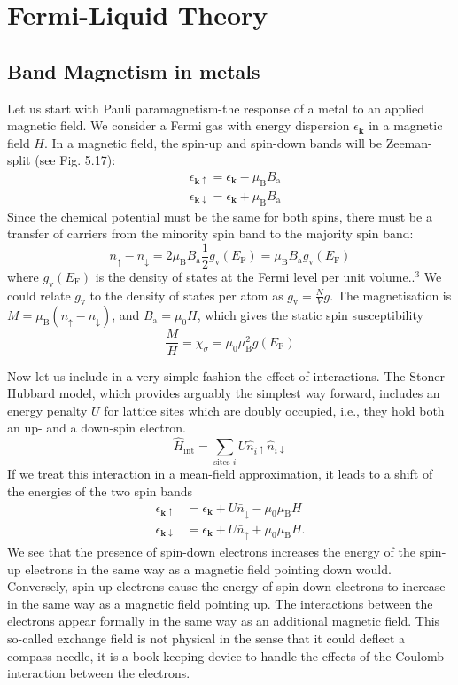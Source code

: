 \documentclass[12pt,a4paper]{article}
\begin{document}
\section{Fermi-Liquid Theory}
\subsection{Band Magnetism in metals}
Let us start with Pauli paramagnetism-the response of a metal to an applied magnetic field. We consider a Fermi gas with energy dispersion $\epsilon_{\boldsymbol{k}}$ in a magnetic field $H$. In a magnetic field, the spin-up and spin-down bands will be Zeeman-split (see Fig. 5.17):
$$
\begin{aligned}
& \epsilon_{\boldsymbol{k} \uparrow}=\epsilon_{\boldsymbol{k}}-\mu_{\mathrm{B}} B_{\mathrm{a}} \\
& \epsilon_{\boldsymbol{k} \downarrow}=\epsilon_{\boldsymbol{k}}+\mu_{\mathrm{B}} B_{\mathrm{a}}
\end{aligned}
$$
Since the chemical potential must be the same for both spins, there must be a transfer of carriers from the minority spin band to the majority spin band:
$$
n_{\uparrow}-n_{\downarrow}=2 \mu_{\mathrm{B}} B_{\mathrm{a}} \frac{1}{2} g_{\mathrm{v}}\left(E_{\mathrm{F}}\right)=\mu_{\mathrm{B}} B_{\mathrm{a}} g_{\mathrm{v}}\left(E_{\mathrm{F}}\right)
$$
where $g_{\mathrm{v}}\left(E_{\mathrm{F}}\right)$ is the density of states at the Fermi level per unit volume..$^3$ We could relate $g_{\mathrm{v}}$ to the density of states per atom as $g_{\mathrm{v}}=\frac{N}{V} g$. The magnetisation is $M=\mu_{\mathrm{B}}\left(n_{\uparrow}-n_{\downarrow}\right)$, and $B_{\mathrm{a}}=\mu_0 H$, which gives the static spin susceptibility
$$
\frac{M}{H}=\chi_\sigma=\mu_0 \mu_{\mathrm{B}}^2 g\left(E_{\mathrm{F}}\right)
$$

Now let us include in a very simple fashion the effect of interactions. The Stoner-Hubbard model, which provides arguably the simplest way forward, includes an energy penalty $U$ for lattice sites which are doubly occupied, i.e., they hold both an up- and a down-spin electron.
$$
\hat{H}_{\mathrm{int}}=\sum_{\text {sites } i} U \hat{n}_{i \uparrow} \hat{n}_{i \downarrow}
$$
If we treat this interaction in a mean-field approximation, it leads to a shift of the energies of the two spin bands
$$
\begin{aligned}
\epsilon_{\boldsymbol{k} \uparrow} & =\epsilon_{\boldsymbol{k}}+U \bar{n}_{\downarrow}-\mu_0 \mu_{\mathrm{B}} H \\
\epsilon_{\boldsymbol{k} \downarrow} & =\epsilon_{\boldsymbol{k}}+U \bar{n}_{\uparrow}+\mu_0 \mu_{\mathrm{B}} H .
\end{aligned}
$$
We see that the presence of spin-down electrons increases the energy of the spin-up electrons in the same way as a magnetic field pointing down would. Conversely, spin-up electrons cause the energy of spin-down electrons to increase in the same way as a magnetic field pointing up. The interactions between the electrons appear formally in the same way as an additional magnetic field. This so-called exchange field is not physical in the sense that it could deflect a compass needle, it is a book-keeping device to handle the effects of the Coulomb interaction between the electrons.
\end{document}
